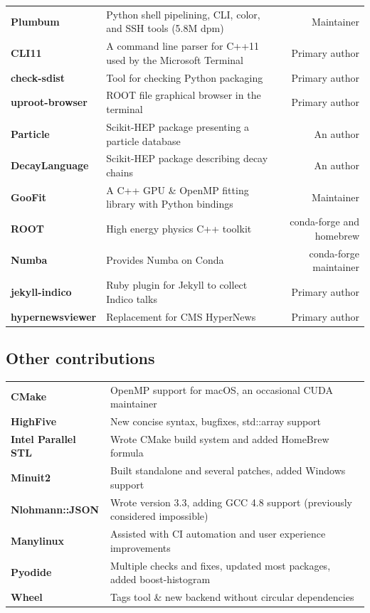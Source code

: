 \documentclass[10pt,letterpaper]{moderncv}
\begin{document}
\begin{tabularx}{\textwidth}{>{\bfseries}p{1.2in}>{\raggedright\arraybackslash}Xr}
    Plumbum & Python shell pipelining, CLI, color, and SSH tools (5.8M dpm) & Maintainer \\
    CLI11 & A command line parser for C++11 used by the Microsoft Terminal & Primary author \\
    check-sdist & Tool for checking Python packaging & Primary author \\
    uproot-browser & ROOT file graphical browser in the terminal & Primary author \\
    Particle & Scikit-HEP package presenting a particle database & An author \\
    DecayLanguage & Scikit-HEP package describing decay chains & An author \\
    GooFit & A C++ GPU \& OpenMP fitting library with Python bindings & Maintainer \\
    ROOT & High energy physics C++ toolkit & conda-forge and homebrew \\
    Numba & Provides Numba on Conda & conda-forge maintainer \\
    jekyll-indico & Ruby plugin for Jekyll to collect Indico talks & Primary author \\
    hypernewsviewer & Replacement for CMS HyperNews & Primary author \\
\end{tabularx}


\subsection{Other contributions}
\begin{tabularx}{\textwidth}{>{\bfseries}p{1.4in}>{\raggedright\arraybackslash}X}
    CMake          & OpenMP support for macOS, an occasional CUDA maintainer  \\
    HighFive       & New concise syntax, bugfixes, std::array support  \\
    Intel Parallel STL & Wrote CMake build system and added HomeBrew formula \\
    Minuit2        & Built standalone and several patches, added Windows support \\
    Nlohmann::JSON & Wrote version 3.3, adding GCC 4.8 support (previously considered impossible) \\
    Manylinux      & Assisted with CI automation and user experience improvements \\
    Pyodide        & Multiple checks and fixes, updated most packages, added boost-histogram \\
    Wheel          & Tags tool \& new backend without circular dependencies \\
\end{tabularx}
\end{document}
